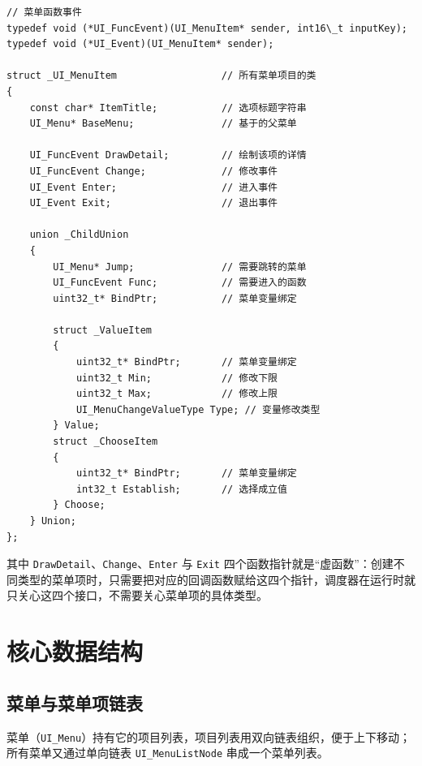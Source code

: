 \begin{lstlisting}[style=c]
// 菜单函数事件
typedef void (*UI_FuncEvent)(UI_MenuItem* sender, int16\_t inputKey);
typedef void (*UI_Event)(UI_MenuItem* sender);

struct _UI_MenuItem                  // 所有菜单项目的类
{
    const char* ItemTitle;           // 选项标题字符串
    UI_Menu* BaseMenu;               // 基于的父菜单

    UI_FuncEvent DrawDetail;         // 绘制该项的详情
    UI_FuncEvent Change;             // 修改事件
    UI_Event Enter;                  // 进入事件
    UI_Event Exit;                   // 退出事件

    union _ChildUnion
    {
        UI_Menu* Jump;               // 需要跳转的菜单
        UI_FuncEvent Func;           // 需要进入的函数
        uint32_t* BindPtr;           // 菜单变量绑定

        struct _ValueItem
        {
            uint32_t* BindPtr;       // 菜单变量绑定
            uint32_t Min;            // 修改下限
            uint32_t Max;            // 修改上限
            UI_MenuChangeValueType Type; // 变量修改类型
        } Value;
        struct _ChooseItem
        {
            uint32_t* BindPtr;       // 菜单变量绑定
            int32_t Establish;       // 选择成立值
        } Choose;
    } Union;
};
\end{lstlisting}

其中 \texttt{DrawDetail}、\texttt{Change}、\texttt{Enter} 与 \texttt{Exit} 四个函数指针就是“虚函数”：创建不同类型的菜单项时，只需要把对应的回调函数赋给这四个指针，调度器在运行时就只关心这四个接口，不需要关心菜单项的具体类型。

\section{核心数据结构}

\subsection{菜单与菜单项链表}

菜单（\texttt{UI\_Menu}）持有它的项目列表，项目列表用双向链表组织，便于上下移动；所有菜单又通过单向链表 \texttt{UI\_MenuListNode} 串成一个菜单列表。

